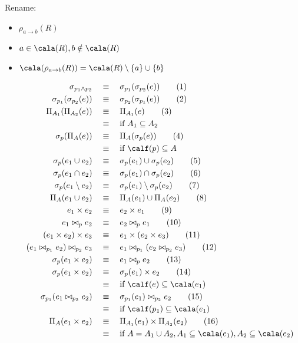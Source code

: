 \documentclass[11pt]{article}
\begin{document}
Rename:
\begin{itemize}
\item \(\rho_{a\to b}(R)\)
\item \(a\in \cala(R),b\notin\cala(R)\)
\item \(\cala(\rho_{a\to b}(R))=\cala(R)\setminus\{a\}\cup\{b\}\)

\begin{align*}
\sigma_{p_1\wedge p_2}&\quad\equiv\quad\sigma_{p_1}(\sigma_{p_2}(e))\tag{1}\\
\sigma_{p_1}(\sigma_{p_2}(e))&\quad\equiv\quad\sigma_{p_2}(\sigma_{p_1}(e))\tag{2}\\
\Pi_{A_1}(\Pi_{A_2}(e))&\quad\equiv\quad\Pi_{A_1}(e)\tag{3}\\
&\quad\equiv\quad\text{if }A_1\subseteq A_2\\
\sigma_p(\Pi_A(e))&\quad\equiv\quad\Pi_A(\sigma_p(e))\tag{4}\\
&\quad\equiv\quad\text{if }\calf(p)\subseteq A\\
\sigma_p(e_1\cup e_2)&\quad\equiv\quad\sigma_p(e_1)\cup\sigma_p(e_2)\tag{5}\\
\sigma_p(e_1\cap e_2)&\quad\equiv\quad\sigma_p(e_1)\cap\sigma_p(e_2)\tag{6}\\
\sigma_p(e_1\setminus e_2)&\quad\equiv\quad\sigma_p(e_1)\setminus\sigma_p(e_2)\tag{7}\\
\Pi_A(e_1\cup e_2)&\quad\equiv\quad\Pi_A(e_1)\cup\Pi_A(e_2)\tag{8}\\
e_1\times e_2&\quad\equiv\quad e_2\times e_1\tag{9}\\
e_1\bowtie_pe_2&\quad\equiv\quad e_2\bowtie_pe_1\tag{10}\\
(e_1\times e_2)\times e_3&\quad\equiv\quad e_1\times(e_2\times e_3)\tag{11}\\
(e_1\bowtie_{p_1}e_2)\bowtie_{p_2}e_3&\quad\equiv\quad e_1\bowtie_{p_1}(e_2\bowtie_{p_2}e_3)\tag{12}\\
\sigma_p(e_1\times e_2)&\quad\equiv\quad e_1\bowtie_pe_2\tag{13}\\
\sigma_p(e_1\times e_2)&\quad\equiv\quad\sigma_p(e_1)\times e_2\tag{14}\\
&\quad\equiv\quad\text{if }\calf(e)\subseteq\cala(e_1)\\
\sigma_{p_1}(e_1\bowtie_{p_2}e_2)&\quad\equiv\quad\sigma_{p_1}(e_1)\bowtie_{p_2}e_2\tag{15}\\
&\quad\equiv\quad\text{if }\calf(p_1)\subseteq\cala(e_1)\\
\Pi_A(e_1\times e_2)&\quad\equiv\quad\Pi_{A_1}(e_1)\times\Pi_{A_2}(e_2)\tag{16}\\
&\quad\equiv\quad\text{if }A=A_1\cup A_2, A_1\subseteq\cala(e_1),A_2\subseteq\cala(e_2)
\end{align*}
\end{itemize}
\end{document}
